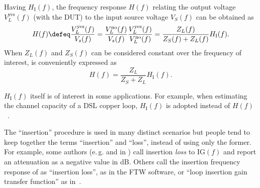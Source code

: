 Having $H_{\textrm{I}}(f)$, the frequency response $H(f)$ relating the output voltage $V_L^{\textrm{yes}}(f)$ (with the DUT) to the input source voltage $V_S(f)$ can be obtained as
\begin{equation}
H(f) \defeq \frac {V_L^{\textrm{yes}}(f)} {V_s(f)}  = \frac {V_L^{\textrm{no}}(f)} {V_s(f)} \frac {V_L^{\textrm{yes}}(f)} {V_L^{\textrm{no}}(f)} = \frac {Z_L(f)} {Z_S(f) +
Z_L(f)}H_{\textrm{I}}(f).	
	\label{eq:frequencyResponseFromHI}
\end{equation}
When $Z_L(f)$ and $Z_S(f)$ can be considered constant over the frequency of interest,  is conveniently expressed as
\begin{equation}
H(f) = \frac {Z_L} {Z_S +
Z_L} H_{\textrm{I}}(f).
	\label{eq:frequencyResponseFromHI2}
\end{equation}

$H_{\textrm{I}}(f)$ itself is of interest in some applications. For example, when estimating the channel capacity of a DSL copper loop, $H_{\textrm{I}}(f)$ is adopted instead of $H(f)$~\cite{T1417}.

The ``insertion'' procedure is used in many distinct scenarios but people tend to keep together the terms ``insertion'' and ``loss'', instead of using only the former. 
For example, some authors (e.\,g. \cite{Ciofficn} and in ) call insertion \emph{loss} to $\textrm{IG}(f)$ and report an attenuation as a negative value in dB.
Others call the insertion frequency response of  as ``insertion loss'', as in the FTW software, or ``loop insertion gain transfer function'' as in~\cite{T1417}.